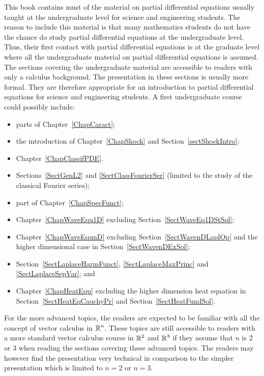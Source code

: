 This book contains must of the material on partial differential
equations usually taught at the undergraduate level for science and
engineering students.  The reason to include this material is that
many mathematics students do not have the chance do study partial
differential equations at the undergraduate level.  Thus, their first
contact with partial differential equations is at the graduate level
where all the undergraduate material on partial differential equations
is assumed.  The sections
covering the undergraduate material are accessible to readers with
only a calculus background.  The presentation in these sections is
usually more formal.  They are therefore appropriate for an
introduction to partial differential equations for science and
engineering students.  A first undergraduate course could 
possibly include:
{
\begin{itemize} \setlength{\itemsep}{0ex} \setlength{\parskip}{0ex}  
\item parts of Chapter~\ref{ChapCaract};
\item the introduction of Chapter~\ref{ChapShock} and
Section~\ref{sectShockIntro};
\item Chapter~\ref{ChapClassifPDE}.
\item Sections~\ref{SectGenL2} and \ref{SectClassFourierSer} (limited
  to the study of the classical Fourier series);
\item part of Chapter~\ref{ChapSpecFunct};
\item Chapter~\ref{ChapWaveEqu1D} excluding Section~\ref{SectWaveEq1DStSol};
\item Chapter~\ref{ChapWaveEqunD} excluding Section~\ref{SectWavenDLaplOp}
and the higher dimensional case in Section~\ref{SectWavenDExSol};
\item Section~\ref{SectLaplaceHarmFunct}, \ref{SectLaplaceMaxPrinc} and
\ref{SectLaplaceSepVar}; and
\item Chapter~\ref{ChapHeatEqu} excluding the higher dimension heat
equation in Section~\ref{SectHeatEqCauchyPr} and Section~\ref{SectHeatFundSol}.
\end{itemize}
}

For the more advanced topics, the readers are expected to be familiar
with all the concept of vector calculus in $\displaystyle \mathbb{R}^n$.
These topics are still accessible to readers with a more standard
vector calculus course in $\displaystyle \mathbb{R}^2$ and
$\displaystyle \mathbb{R}^3$ if they assume that $n$ is $2$ or
$3$ when reading the sections covering these advanced topics.
The readers may however find the presentation very technical in
comparison to the simpler presentation which is limited to $n=2$ or
$n=3$.

